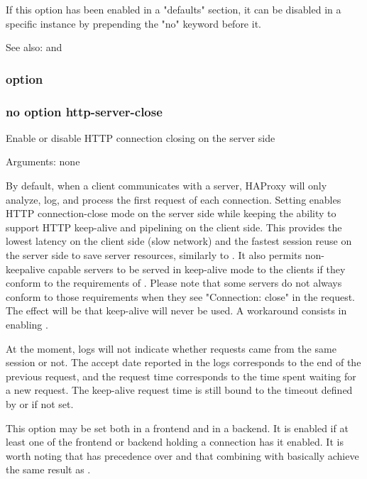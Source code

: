  If this option has been enabled in a "defaults" section, it can be disabled
  in a specific instance by prepending the "no" keyword before it.

  See also:  and 

\subsubsection[http-server-close]{option }
\subsubsection*{no option http-server-close}


  Enable or disable HTTP connection closing on the server side


  Arguments: none

  By default, when a client communicates with a server, HAProxy will only
  analyze, log, and process the first request of each connection. Setting
   enables HTTP connection-close mode on the server
  side while keeping the ability to support HTTP keep-alive and pipelining on
  the client side.  This provides the lowest latency on the client side (slow
  network) and the fastest session reuse on the server side to save server
  resources, similarly to . It also permits non-keepalive
  capable servers to be served in keep-alive mode to the clients if they
  conform to the requirements of . Please note that some servers do not
  always conform to those requirements when they see "Connection: close" in the
  request. The effect will be that keep-alive will never be used. A workaround
  consists in enabling .

  At the moment, logs will not indicate whether requests came from the same
  session or not. The accept date reported in the logs corresponds to the end
  of the previous request, and the request time corresponds to the time spent
  waiting for a new request. The keep-alive request time is still bound to the
  timeout defined by  or  if
  not set.

  This option may be set both in a frontend and in a backend. It is enabled if
  at least one of the frontend or backend holding a connection has it enabled.
  It is worth noting that  has precedence over 
  and that combining  with 
  basically achieve the same result as .

